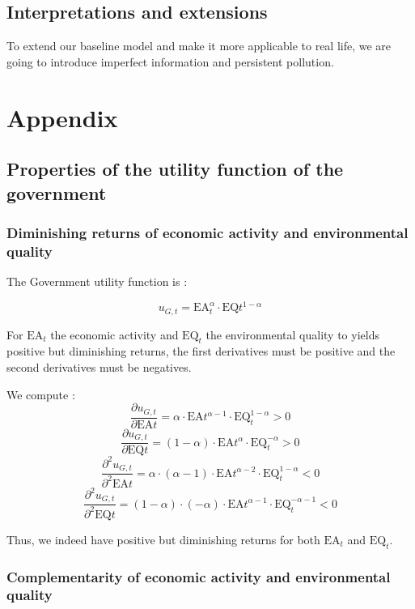 \documentclass{article}
\begin{document}
\subsection{Interpretations and extensions}

To extend our baseline model and make it more applicable to real life, we are going to introduce imperfect information and persistent pollution. 

\pagebreak
\section{Appendix}

\subsection{Properties of the utility function of the government}

\subsubsection{Diminishing returns of economic activity and environmental quality}
\label{sec:properties_utility_function_gov_1}
The Government utility function is :

\begin{equation*}
    u_{G,t}=\text{EA}_{t}^{\alpha}\cdot\text{EQ}{t}^{1-\alpha}
\end{equation*}

For $\text{EA}_{t}$ the economic activity and $\text{EQ}_{t}$ the environmental quality to yields positive but diminishing returns, the first derivatives must be positive and the second derivatives must be negatives. 

We compute : 
$$\frac{\partial u_{G,t}}{\partial \text{EA}{t}}=\alpha\cdot\text{EA}{t}^{\alpha-1}\cdot\text{EQ}_{t}^{1-\alpha}>0$$
$$\frac{\partial u_{G,t}}{\partial \text{EQ}{t}}=(1-\alpha)\cdot\text{EA}{t}^{\alpha}\cdot\text{EQ}_{t}^{-\alpha}>0$$
$$\frac{\partial^2 u_{G,t}}{\partial^2 \text{EA}{t}}=\alpha\cdot(\alpha-1)\cdot\text{EA}{t}^{\alpha-2}\cdot\text{EQ}_{t}^{1-\alpha}<0$$
$$\frac{\partial^2 u_{G,t}}{\partial^2 \text{EQ}{t}}=(1-\alpha)\cdot(-\alpha)\cdot\text{EA}{t}^{\alpha-1}\cdot\text{EQ}_{t}^{-\alpha-1}<0$$

Thus, we indeed have positive but diminishing returns for both $\text{EA}_{t}$ and $\text{EQ}_{t}$.

\subsubsection{Complementarity of economic activity and environmental quality}
\label{sec:properties_utility_function_gov_2}
\end{document}
